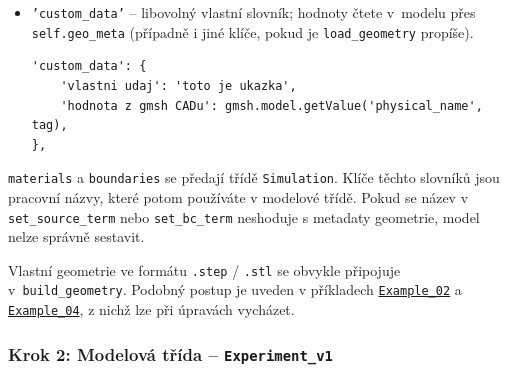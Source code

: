 \documentclass[a4paper,11pt]{article}
\newcommand{\GitHubExTwoDirURL}{https://github.com/LiborKudela/heat-battery/tree/master/examples/Example_02}
\newcommand{\GitHubExTwoDir}{\href{\GitHubExTwoDirURL}{\texttt{Example\_02}}}
\newcommand{\GitHubExFourDirURL}{https://github.com/LiborKudela/heat-battery/tree/master/examples/Example_04}
\newcommand{\GitHubExFourDir}{\href{\GitHubExFourDirURL}{\texttt{Example\_04}}}
\begin{document}
\begin{itemize}
\begin{lstlisting}[style=py]
'points': {
    'T': {
        'teplota v topidle': [0.022, 0.15, 0.0],
        'teplota ve stredu': [0.0, 0.0, 0.0],
    },
},
\end{lstlisting}

  \item \texttt{'custom\_data'} -- libovolný vlastní slovník; hodnoty čtete v~modelu
        přes \texttt{self.geo\_meta} (případně i jiné klíče, pokud je
        \texttt{load\_geometry} propíše).

\begin{lstlisting}[style=py]
'custom_data': {
    'vlastni udaj': 'toto je ukazka',
    'hodnota z gmsh CADu': gmsh.model.getValue('physical_name', tag),
},
\end{lstlisting}

\end{itemize}

\noindent
\texttt{materials} a \texttt{boundaries} se předají třídě \texttt{Simulation}.
Klíče těchto slovníků jsou pracovní názvy, které potom používáte v modelové
třídě. Pokud se název v \texttt{set\_source\_term} nebo \texttt{set\_bc\_term}
neshoduje s metadaty geometrie, model nelze správně sestavit.


\begin{noteblock}
Vlastní geometrie ve formátu \texttt{.step} / \texttt{.stl} se obvykle připojuje
v~\texttt{build\_geometry}. Podobný postup je uveden v příkladech
\GitHubExTwoDir{} a \GitHubExFourDir{}, z nichž lze při úpravách vycházet.
\end{noteblock}

\subsubsection*{Krok 2: Modelová třída -- \texttt{Experiment\_v1}}
\end{document}
